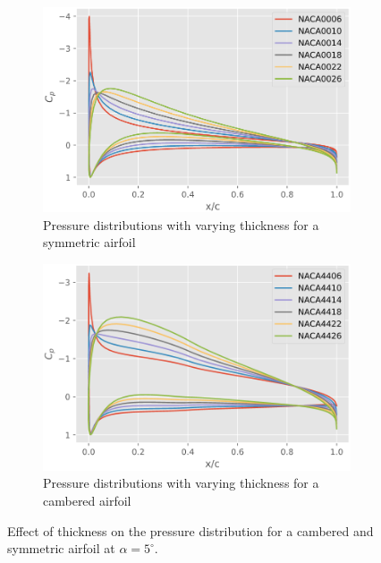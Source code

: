 \begin{figure}[h]
  \centering
  \begin{subfigure}{.5\textwidth}
    \centering
    \captionsetup{width=.8\linewidth}
    \includegraphics[width=.9\linewidth]{static/thickness_effect_00xx.png}
    \caption{\centering Pressure distributions with varying thickness for a symmetric airfoil}
    \label{fig:thickcp1}
  \end{subfigure}\hfill%
  \begin{subfigure}{.5\textwidth}
    \centering
    \captionsetup{width=.9\linewidth}
    \includegraphics[width=.9\linewidth]{static/thickness_effect_44xx.png}
    \caption{\centering Pressure distributions with varying thickness for a cambered airfoil}
    \label{fig:thickcp2}
  \end{subfigure}
  \caption{\centering Effect of thickness on the pressure distribution for a cambered and symmetric airfoil at $\alpha = 5^{\circ}$.}
  \label{fig:thickcp}
\end{figure}

